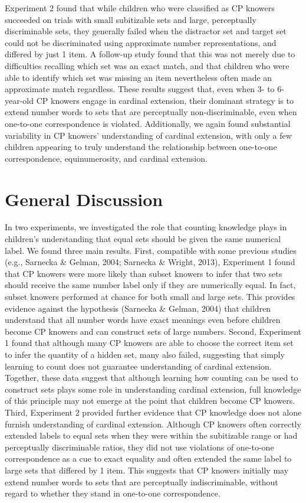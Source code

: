 \documentclass[
  man,floatsintext]{apa7}
\begin{document}
Experiment 2 found that while children who were classified as CP knowers succeeded on trials with small subitizable sets and large, perceptually discriminable sets, they generally failed when the distractor set and target set could not be discriminated using approximate number representations, and differed by just 1 item. A follow-up study found that this was not merely due to difficulties recalling which set was an exact match, and that children who were able to identify which set was missing an item nevertheless often made an approximate match regardless. These results suggest that, even when 3- to 6-year-old CP knowers engage in cardinal extension, their dominant strategy is to extend number words to sets that are perceptually non-discriminable, even when one-to-one correspondence is violated. Additionally, we again found substantial variability in CP knowers' understanding of cardinal extension, with only a few children appearing to truly understand the relationship between one-to-one correspondence, equinumerosity, and cardinal extension.

\hypertarget{general-discussion}{%
\section{General Discussion}\label{general-discussion}}

In two experiments, we investigated the role that counting knowledge plays in children's understanding that equal sets should be given the same numerical label. We found three main results. First, compatible with some previous studies (e.g., Sarnecka \& Gelman, 2004; Sarnecka \& Wright, 2013), Experiment 1 found that CP knowers were more likely than subset knowers to infer that two sets should receive the same number label only if they are numerically equal. In fact, subset knowers performed at chance for both small and large sets. This provides evidence against the hypothesis (Sarnecka \& Gelman, 2004) that children understand that all number words have exact meanings even before children become CP knowers and can construct sets of large numbers. Second, Experiment 1 found that although many CP knowers are able to choose the correct item set to infer the quantity of a hidden set, many also failed, suggesting that simply learning to count does not guarantee understanding of cardinal extension. Together, these data suggest that although learning how counting can be used to construct sets plays some role in understanding cardinal extension, full knowledge of this principle may not emerge at the point that children become CP knowers. Third, Experiment 2 provided further evidence that CP knowledge does not alone furnish understanding of cardinal extension. Although CP knowers often correctly extended labels to equal sets when they were within the subitizable range or had perceptually discriminable ratios, they did not use violations of one-to-one correspondence as a cue to exact equality and often extended the same label to large sets that differed by 1 item. This suggests that CP knowers initially may extend number words to sets that are perceptually indiscriminable, without regard to whether they stand in one-to-one correspondence.
\end{document}
